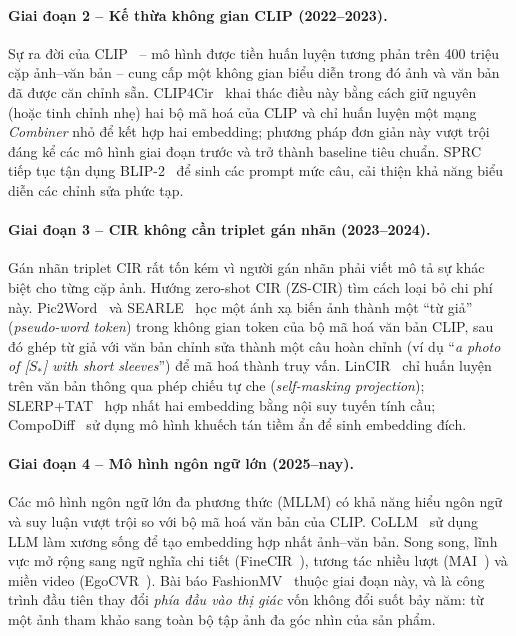 \paragraph{Giai đoạn 2 -- Kế thừa không gian CLIP (2022--2023).} Sự ra đời của CLIP~\cite{radford2021clip} -- mô hình được tiền huấn luyện tương phản trên 400 triệu cặp ảnh--văn bản -- cung cấp một không gian biểu diễn trong đó ảnh và văn bản đã được căn chỉnh sẵn. CLIP4Cir~\cite{baldrati2022clip4cir} khai thác điều này bằng cách giữ nguyên (hoặc tinh chỉnh nhẹ) hai bộ mã hoá của CLIP và chỉ huấn luyện một mạng \emph{Combiner} nhỏ để kết hợp hai embedding; phương pháp đơn giản này vượt trội đáng kể các mô hình giai đoạn trước và trở thành baseline tiêu chuẩn. SPRC~\cite{bai2024sprc} tiếp tục tận dụng BLIP-2~\cite{li2023blip2} để sinh các prompt mức câu, cải thiện khả năng biểu diễn các chỉnh sửa phức tạp.

\paragraph{Giai đoạn 3 -- CIR không cần triplet gán nhãn (2023--2024).} Gán nhãn triplet CIR rất tốn kém vì người gán nhãn phải viết mô tả sự khác biệt cho từng cặp ảnh. Hướng zero-shot CIR (ZS-CIR) tìm cách loại bỏ chi phí này. Pic2Word~\cite{saito2023pic2word} và SEARLE~\cite{baldrati2023searle} học một ánh xạ biến ảnh thành một ``từ giả'' (\emph{pseudo-word token}) trong không gian token của bộ mã hoá văn bản CLIP, sau đó ghép từ giả với văn bản chỉnh sửa thành một câu hoàn chỉnh (ví dụ ``\emph{a photo of [$S_*$] with short sleeves}'') để mã hoá thành truy vấn. LinCIR~\cite{gu2024lincir} chỉ huấn luyện trên văn bản thông qua phép chiếu tự che (\emph{self-masking projection}); SLERP+TAT~\cite{jang2024slerp} hợp nhất hai embedding bằng nội suy tuyến tính cầu; CompoDiff~\cite{gu2024compodiff} sử dụng mô hình khuếch tán tiềm ẩn để sinh embedding đích.

\paragraph{Giai đoạn 4 -- Mô hình ngôn ngữ lớn (2025--nay).} Các mô hình ngôn ngữ lớn đa phương thức (MLLM) có khả năng hiểu ngôn ngữ và suy luận vượt trội so với bộ mã hoá văn bản của CLIP. CoLLM~\cite{huynh2025collm} sử dụng LLM làm xương sống để tạo embedding hợp nhất ảnh--văn bản. Song song, lĩnh vực mở rộng sang ngữ nghĩa chi tiết (FineCIR~\cite{li2025finecir}), tương tác nhiều lượt (MAI~\cite{chen2025mai}) và miền video (EgoCVR~\cite{hummel2024egocvr}). Bài báo FashionMV~\cite{yuan2026fashionmv} thuộc giai đoạn này, và là công trình đầu tiên thay đổi \emph{phía đầu vào thị giác} vốn không đổi suốt bảy năm: từ một ảnh tham khảo sang toàn bộ tập ảnh đa góc nhìn của sản phẩm.

